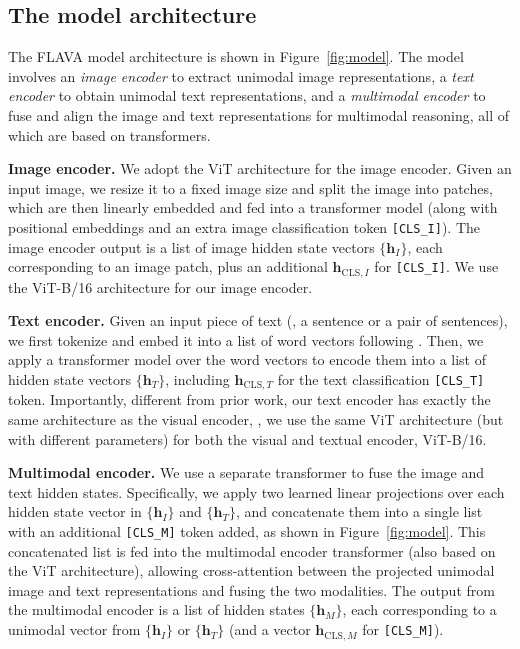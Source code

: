 \documentclass[10pt,twocolumn,letterpaper]{article}
\newcommand{\myparagraph}[1]{\vspace{0.25em}\noindent\textbf{#1}}
\begin{document}
\subsection{The model architecture}
\label{sec:architecture}

The FLAVA model architecture is shown in Figure~\ref{fig:model}. The model involves an \textit{image encoder} to extract unimodal image representations, a \textit{text encoder} to obtain unimodal text representations, and a \textit{multimodal encoder} to fuse and align the image and text representations for multimodal reasoning, all of which are based on transformers.

\myparagraph{Image encoder.} We adopt the ViT architecture \cite{dosovitskiy2020image} for the image encoder. Given an input image, we resize it to a fixed image size and split the image into patches, which are then linearly embedded and fed into a transformer model (along with positional embeddings and an extra image classification token \texttt{[CLS\_I]}). The image encoder output is a list of image hidden state vectors $\{\mathbf{h}_I\}$, each corresponding to an image patch, plus an additional $\mathbf{h}_{\mathrm{CLS},I}$ for \texttt{[CLS\_I]}. We use the ViT-B/16 architecture for our image encoder.

\myparagraph{Text encoder.} Given an input piece of text (\eg, a sentence or a pair of sentences), we first tokenize and embed it into a list of word vectors following \cite{devlin2018bert}. Then, we apply a transformer model over the word vectors to encode them into a list of hidden state vectors $\{\mathbf{h}_T\}$, including $\mathbf{h}_{\mathrm{CLS},T}$ for the text classification \texttt{[CLS\_T]} token. Importantly, different from prior work, our text encoder has exactly the same architecture as the visual encoder, \ie, we use the same ViT architecture (but with different parameters) for both the visual and textual encoder, \ie ViT-B/16.

\myparagraph{Multimodal encoder.} We use a separate transformer to fuse the image and text hidden states. Specifically, we apply two learned linear projections over each hidden state vector in $\{\mathbf{h}_I\}$ and $\{\mathbf{h}_T\}$, and concatenate them into a single list with an additional \texttt{[CLS\_M]} token added, as shown in Figure~\ref{fig:model}. This concatenated list is fed into the multimodal encoder transformer (also based on the ViT architecture), allowing cross-attention between the projected unimodal image and text representations and fusing the two modalities. The output from the multimodal encoder is a list of hidden states $\{\mathbf{h}_M\}$, each corresponding to a unimodal vector from $\{\mathbf{h}_I\}$ or $\{\mathbf{h}_T\}$ (and a vector $\mathbf{h}_{\mathrm{CLS},M}$ for \texttt{[CLS\_M]}).
\end{document}
